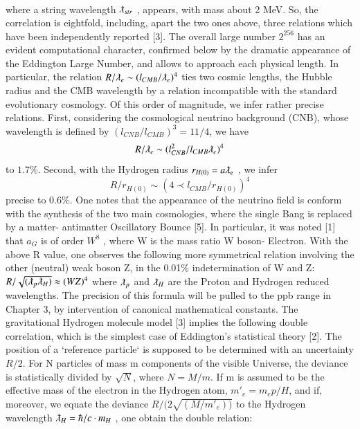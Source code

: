 \documentclass[twoside,draft]{article}
\begin{document}
\begin{sloppypar}
{$$\begin{array}{ll}
\end{array}
$$
where a string wavelength $\lambdabar_{str}$ , appears, with mass about 2 MeV. So, the correlation is eightfold,
including, apart the two ones above, three relations which have been independently reported [3].
The overall large number $2^{256}$ has an evident computational character, confirmed below by the
dramatic appearance of the Eddington Large Number, and allows to approach each physical length.
In particular, the relation $R/\lambdabar_{e} \sim (l_{CMB} / \lambdabar_{e})^{4}$ ties two cosmic lengths, the Hubble radius and the CMB wavelength by a relation incompatible with the standard evolutionary cosmology. Of this order of
magnitude, we infer rather precise relations. First, considering the cosmological neutrino
background (CNB), whose wavelength is defined by $(l_{CNB} / l_{CMB})^{3} = 11/4$, we have $$R/ \lambdabar_{e} \sim
( l_{CNB}^{2} / l_{CMB} \lambdabar_{e} )^{4}$$ to $1.7\%$. Second, with the Hydrogen radius $r_{H(0)} = a\lambdabar_{e}$ , we infer 
\begin{equation}
R/r_{H(0)} \sim (4 \prec l_{CMB} /r_{H(0)} )^{4}
\end{equation}
precise to $0.6\%$. One notes that the appearance of the neutrino field is conform
with the synthesis of the two main cosmologies, where the single Bang is replaced by a matter-
antimatter Oscillatory Bounce [5].
In particular, it was noted [1] that $a_{G}$ is of order $W^{8}$ , where W is the mass ratio W boson-
Electron. With the above R value, one observes the following more symmetrical relation involving
the other (neutral) weak boson Z, in the 0.01\% indetermination of W and Z:
$R/\sqrt{(\lambdabar_{p} \lambdabar_{H})} \approx (WZ)^4$
where $\lambdabar_{p}$ and $\lambdabar_{H}$ are the Proton and Hydrogen reduced wavelengths. The precision of this formula
will be pulled to the ppb range in Chapter 3, by intervention of canonical mathematical constants.
The gravitational Hydrogen molecule model [3] implies the following double correlation,
which is the simplest case of Eddington's statistical theory [2]. The position of a `reference particle`
is supposed to be determined with an uncertainty ${R/2}$. For N particles of mass m components of the visible Universe, the deviance is statistically divided by $\sqrt{N}$, where $N = M/m$. If m is assumed to be
the effective mass of the electron in the Hydrogen atom, $m\prime_{e} = m_{e} p/H$, and if, moreover, we equate
the deviance $R/(2\sqrt{(M/m\prime_{e}))}$ to the Hydrogen wavelength $\lambdabar_{H} = \hbar/c \cdot m_{H}$ , one obtain the double relation:
}
\end{sloppypar}
\end{document}
